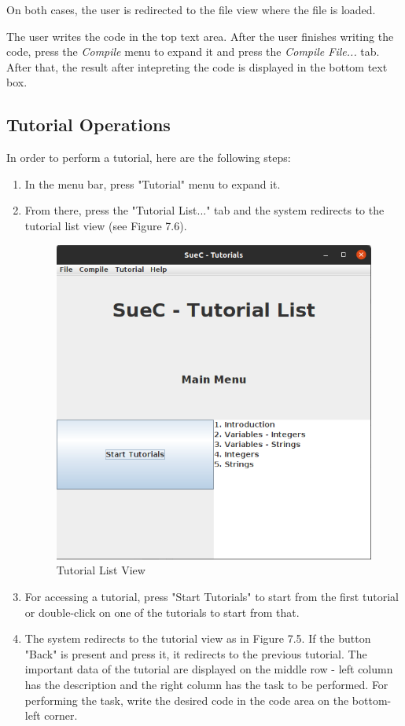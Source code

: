 \documentclass[12pt,a4paper,twoside]{report}
\begin{document}
On both cases, the user is redirected to the file view where the file is loaded.

The user writes the code in the top text area. After the user finishes writing the code, press the \textit{Compile} menu to expand it and press the \textit{Compile File...} tab. After that, the result after intepreting the code is displayed in the bottom text box.

\subsection{Tutorial Operations}

In order to perform a tutorial, here are the following steps:
\begin{enumerate}
\item In the menu bar, press "Tutorial" menu to expand it.
\item From there, press the "Tutorial List..." tab and the system redirects to the tutorial list view (see Figure 7.6).

\begin{figure}[H]
    \centering
    \includegraphics[width=0.75\linewidth]{img/userGuide/TutorialListMenu.png}
    \caption{Tutorial List View}
    \label{fig:conf}
\end{figure}

\item For accessing a tutorial, press "Start Tutorials" to start from the first tutorial or double-click on one of the tutorials to start from that.

\item The system redirects to the tutorial view as in Figure 7.5. If the button "Back" is present and press it, it redirects to the previous tutorial. The important data of the tutorial are displayed on the middle row - left column has the description and the right column has the task to be performed. For performing the task, write the desired code in the code area on the bottom-left corner.


\end{enumerate}
\end{document}
